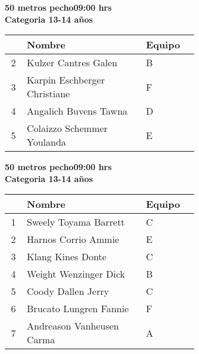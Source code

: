\begin{minipage}{0.95\linewidth}\vspace{0.5cm} 
\begin{flushleft}
\textbf{
\hspace{-0.15cm}50 metros pecho\hspace{1.5cm}09:00 hrs \\Categoria 13-14 años}\vspace{-0.2cm} 
\end{flushleft}
\begin{tabular}{cp{0.63\linewidth}l}
\hline
& \textbf{Nombre} & \textbf{Equipo} \\ \hline
2 & Kulzer Cantres Galen & B \\ 
3 & Karpin Eschberger Christiane & F \\ 
4 & Angalich Buvens Tawna & D \\ 
5 & Colaizzo Schemmer Youlanda & E \\ 
\end{tabular}
\end{minipage}
\begin{minipage}{0.95\linewidth}\vspace{0.5cm} 
\begin{flushleft}
\textbf{
\hspace{-0.15cm}50 metros pecho\hspace{1.5cm}09:00 hrs \\Categoria 13-14 años}\vspace{-0.2cm} 
\end{flushleft}
\begin{tabular}{cp{0.63\linewidth}l}
\hline
& \textbf{Nombre} & \textbf{Equipo} \\ \hline
1 & Sweely Toyama Barrett & C \\ 
2 & Harnos Corrio Ammie & E \\ 
3 & Klang Kines Donte & C \\ 
4 & Weight Wenzinger Dick & B \\ 
5 & Coody Dallen Jerry & C \\ 
6 & Brucato Lungren Fannie & F \\ 
7 & Andreason Vanheusen Carma & A \\ 
\end{tabular}
\end{minipage}
